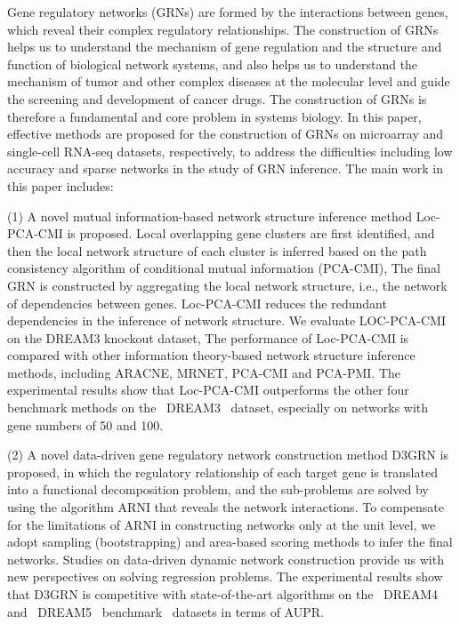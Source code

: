 \begin{abstracten}

Gene regulatory networks (GRNs) are formed by the interactions between genes, 
which reveal their complex regulatory relationships. 
The construction of GRNs helps us to understand the mechanism of gene regulation and the structure and function of biological network systems, 
and also helps us to understand the mechanism of tumor and other complex diseases at the molecular level and guide the screening and development of cancer drugs. 
The construction of GRNs is therefore a fundamental and core problem in systems biology. 
In this paper, effective methods are proposed for the construction of GRNs on microarray and single-cell RNA-seq datasets, respectively, 
to address the difficulties including low accuracy and sparse networks in the study of GRN inference.
The main work in this paper includes:

(1) A novel mutual information-based network structure inference method Loc-PCA-CMI is proposed.
Local overlapping gene clusters are first identified, and then the local network structure of each cluster is inferred based on the path consistency algorithm of conditional mutual information (PCA-CMI),
The final GRN is constructed by aggregating the local network structure, i.e., the network of dependencies between genes.
Loc-PCA-CMI reduces the redundant dependencies in the inference of network structure.
We evaluate LOC-PCA-CMI on the DREAM3 knockout dataset,
The performance of Loc-PCA-CMI is compared with other information theory-based network structure inference methods, including ARACNE, MRNET, PCA-CMI and PCA-PMI.
The experimental results show that Loc-PCA-CMI outperforms the other four benchmark methods on the ~DREAM3~ dataset, especially on networks with gene numbers of 50 and 100.

(2) A novel data-driven gene regulatory network construction method D3GRN is proposed, in which the regulatory relationship of each target gene is translated into a functional decomposition problem, 
and the sub-problems are solved by using the algorithm ARNI that reveals the network interactions. 
To compensate for the limitations of ARNI in constructing networks only at the unit level, 
we adopt sampling (bootstrapping) and area-based scoring methods to infer the final networks. 
Studies on data-driven dynamic network construction provide us with new perspectives on solving regression problems. 
The experimental results show that D3GRN is competitive with state-of-the-art algorithms on the ~DREAM4~ and ~DREAM5~ benchmark~ datasets in terms of AUPR.


\end{abstracten}

